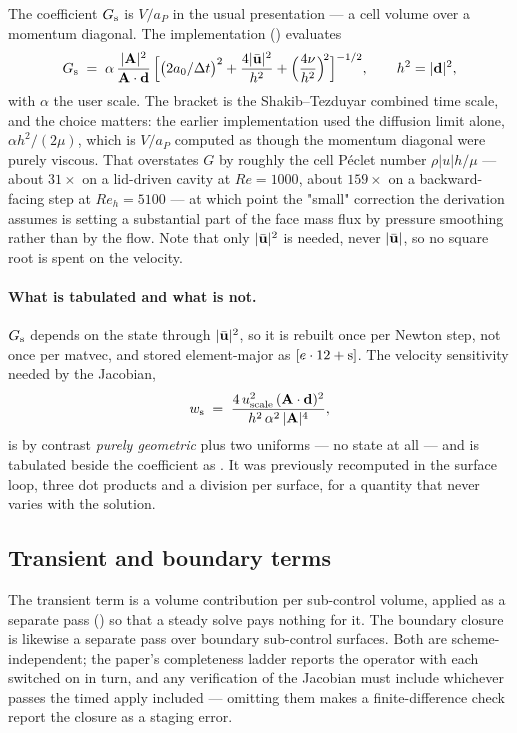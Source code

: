 The coefficient $G_{\mathrm{s}}$ is $V/a_P$ in the usual presentation --- a cell volume over a momentum
diagonal. The implementation () evaluates
\begin{equation}
G_{\mathrm{s}} \;=\; \alpha\,\frac{|\mathbf{A}|^2}{\mathbf{A}\cdot\mathbf{d}}\,
      \Bigl[\bigl(2a_0/\Delta t\bigr)^2 + \frac{4|\bar{\mathbf{u}}|^2}{h^2}
            + \Bigl(\frac{4\nu}{h^2}\Bigr)^{\!2}\Bigr]^{-1/2},
\qquad h^2 = |\mathbf{d}|^2 ,
\label{eq:coeff}
\end{equation}
with $\alpha$ the user scale. The bracket is the Shakib--Tezduyar combined time scale, and the
choice matters: the earlier implementation used the diffusion limit alone,
$\alpha h^2/(2\mu)$, which is $V/a_P$ computed as though the momentum diagonal were purely
viscous. That overstates $G$ by roughly the cell P\'eclet number $\rho|u|h/\mu$ --- about $31\times$
on a lid-driven cavity at $Re=1000$, about $159\times$ on a backward-facing step at
$Re_h = 5100$ --- at which point the "small" correction the derivation assumes is setting a
substantial part of the face mass flux by pressure smoothing rather than by the flow. Note that
only $|\bar{\mathbf{u}}|^2$ is needed, never $|\bar{\mathbf{u}}|$, so no square root is spent on the
velocity.

\paragraph{What is tabulated and what is not.} $G_{\mathrm{s}}$ depends on the state through
$|\bar{\mathbf{u}}|^2$, so it is rebuilt once per Newton step, not once per matvec, and stored
element-major as $[e\cdot 12 + \mathrm{s}]$. The velocity sensitivity needed by the
Jacobian,
\begin{equation}
w_{\mathrm{s}} \;=\; \frac{4\,u^2_{\text{scale}}\,(\mathbf{A}\cdot\mathbf{d})^2}{h^2\,\alpha^2\,|\mathbf{A}|^4},
\label{eq:wdu}
\end{equation}
is by contrast \emph{purely geometric} plus two uniforms --- no state at all --- and is tabulated
beside the coefficient as . It was previously recomputed in the surface loop, three dot
products and a division per surface, for a quantity that never varies with the solution.

\subsection{Transient and boundary terms}

The transient term is a volume contribution per sub-control volume, applied as a separate pass
() so that a steady solve pays nothing for it. The boundary
closure is likewise a separate pass over boundary sub-control surfaces. Both are
scheme-independent; the paper's completeness ladder reports the operator with each switched on in
turn, and any verification of the Jacobian must include whichever passes the timed apply included
--- omitting them makes a finite-difference check report the closure as a staging error.
